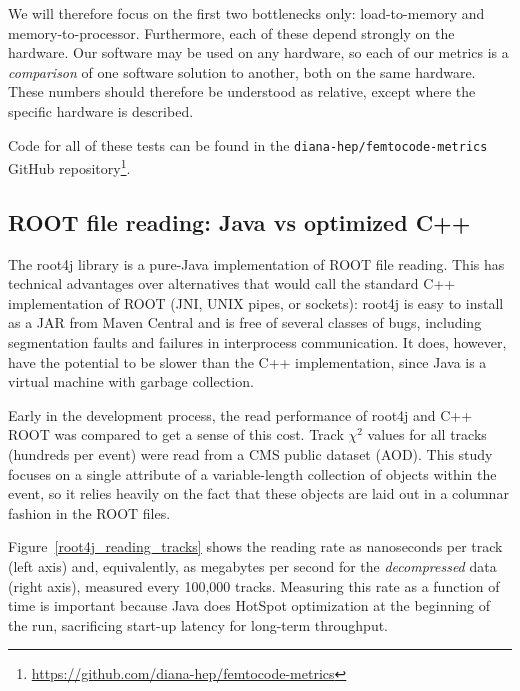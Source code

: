 \documentclass[12pt]{article}
\begin{document}
We will therefore focus on the first two bottlenecks only: load-to-memory and memory-to-processor. Furthermore, each of these depend strongly on the hardware. Our software may be used on any hardware, so each of our metrics is a {\it comparison} of one software solution to another, both on the same hardware. These numbers should therefore be understood as relative, except where the specific hardware is described.

Code for all of these tests can be found in the {\tt diana-hep/femtocode-metrics} GitHub repository\footnote{\url{https://github.com/diana-hep/femtocode-metrics}}.

\subsection*{ROOT file reading: Java vs optimized C++}

The root4j library is a pure-Java implementation of ROOT file reading. This has technical advantages over alternatives that would call the standard C++ implementation of ROOT (JNI, UNIX pipes, or sockets): root4j is easy to install as a JAR from Maven Central and is free of several classes of bugs, including segmentation faults and failures in interprocess communication. It does, however, have the potential to be slower than the C++ implementation, since Java is a virtual machine with garbage collection.

Early in the development process, the read performance of root4j and C++ ROOT was compared to get a sense of this cost. Track $\chi^2$ values for all tracks (hundreds per event) were read from a CMS public dataset (AOD). This study focuses on a single attribute of a variable-length collection of objects within the event, so it relies heavily on the fact that these objects are laid out in a columnar fashion in the ROOT files.

Figure~\ref{root4j_reading_tracks} shows the reading rate as nanoseconds per track (left axis) and, equivalently, as megabytes per second for the {\it decompressed} data (right axis), measured every 100,000 tracks. Measuring this rate as a function of time is important because Java does HotSpot optimization at the beginning of the run, sacrificing start-up latency for long-term throughput.
\end{document}
